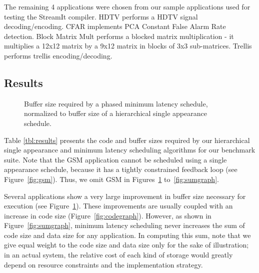 The remaining 4 applications were chosen from our sample applications
used for testing the StreamIt compiler. HDTV performs a HDTV signal
decoding/encoding. CFAR implements PCA Constant False Alarm Rate
detection. Block Matrix Mult performs a blocked matrix multiplication
- it multiplies a 12x12 matrix by a 9x12 matrix in blocks of 3x3
sub-matrices. Trellis performs trellis encoding/decoding.

\begin{comment}

\subsection{Methodology}
\label{sec:results:methodology}

The following data has been collected: number of nodes, number of
node executions per steady state, schedule size and buffer size
for pseudo single appearance and minimal latency schedules.

\subsubsection{Schedule Compression}

\end{comment}

\subsection{Results}
\label{sec:results:results}

\begin{figure}[t]
\vspace{6pt}
\caption{\small Buffer size required by a phased minimum latency schedule,
normalized to buffer size of a hierarchical single appearance
schedule.\protect\label{fig:buffergraph}}
\vspace{-6pt}
\end{figure}

Table \ref{tbl:results} presents the code and buffer sizes required by
our hierarchical single appearance and minimum latency scheduling
algorithms for our benchmark suite.  Note that the GSM application
cannot be scheduled using a single appearance schedule, because it has
a tightly constrained feedback loop (see Figure~\ref{fig:gsm}).  Thus,
we omit GSM in Figures~\ref{fig:buffergraph} to~\ref{fig:sumgraph}.

Several applications show a very large improvement in buffer size
necessary for execution (see Figure~\ref{fig:buffergraph}).  These
improvements are usually coupled with an increase in code size
(Figure~\ref{fig:codegraph}).  However, as shown in
Figure~\ref{fig:sumgraph}, minimum latency scheduling never increases
the sum of code size and data size for any application.  In computing
this sum, note that we give equal weight to the code size and data
size only for the sake of illustration; in an actual system, the
relative cost of each kind of storage would greatly depend on resource
constraints and the implementation strategy.


